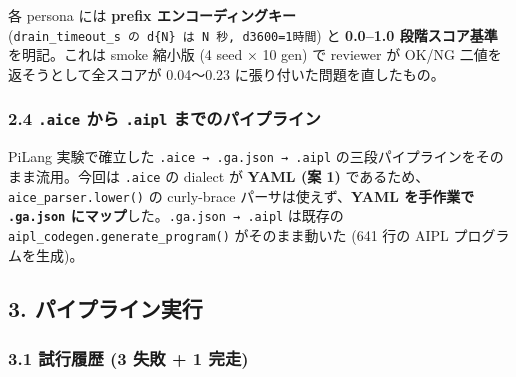 \documentclass[
]{ltjsarticle}
\begin{document}
各 persona には \textbf{prefix エンコーディングキー}
(\texttt{drain\_timeout\_s\ の\ d\{N\}\ は\ N\ 秒,\ d3600=1時間}) と
\textbf{0.0--1.0 段階スコア基準} を明記。これは smoke 縮小版 (4 seed ×
10 gen) で reviewer が OK/NG 二値を返そうとして全スコアが 0.04〜0.23
に張り付いた問題を直したもの。

\subsubsection{\texorpdfstring{2.4 \texttt{.aice} から \texttt{.aipl}
までのパイプライン}{2.4 .aice から .aipl までのパイプライン}}\label{aice-ux304bux3089-.aipl-ux307eux3067ux306eux30d1ux30a4ux30d7ux30e9ux30a4ux30f3}

PiLang 実験で確立した \texttt{.aice\ →\ .ga.json\ →\ .aipl}
の三段パイプラインをそのまま流用。今回は \texttt{.aice} の dialect が
\textbf{YAML (案 1)} であるため、\texttt{aice\_parser.lower()} の
curly-brace パーサは使えず、\textbf{YAML を手作業で \texttt{.ga.json}
にマップ}した。\texttt{.ga.json\ →\ .aipl} は既存の
\texttt{aipl\_codegen.generate\_program()} がそのまま動いた (641 行の
AIPL プログラムを生成)。

\subsection{3.
パイプライン実行}\label{ux30d1ux30a4ux30d7ux30e9ux30a4ux30f3ux5b9fux884c}

\subsubsection{3.1 試行履歴 (3 失敗 + 1
完走)}\label{ux8a66ux884cux5c65ux6b74-3-ux5931ux6557-1-ux5b8cux8d70}
\end{document}
